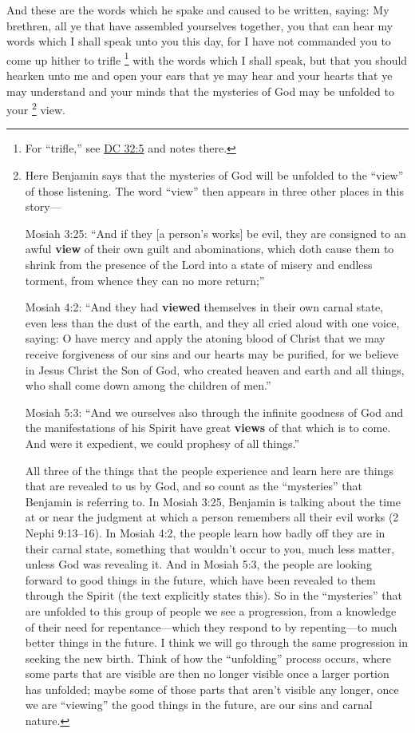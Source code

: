 			And these are the words which he spake and caused to be written, saying:
			My brethren, all ye that have assembled yourselves together,
			you that can hear my words which I shall speak unto you this day,
			for I have not commanded you to come up hither
			to trifle%
				\footnote{%
					For ``trifle,'' see \hyperref[DC32-5]{DC 32:5} and notes there.
					} 
			with the words which I shall speak,
			but that you should hearken unto me
			and open your ears that ye may hear
			and your hearts that ye may understand
			and your minds that the mysteries of God may be unfolded to your
				\footnote{%
					\label{MOSIAH-2-9-NOTE-view}%
					Here Benjamin says that the mysteries of God will be unfolded to the ``view'' of those listening. The word ``view'' then appears in three other places in this story---
						\begin{compactenum}
							\item Mosiah 3:25: ``And if they [a person's works] be evil, they are consigned to an awful \textbf{view} of their own guilt and abominations, which doth cause them to shrink from the presence of the Lord into a state of misery and endless torment, from whence they can no more return;''
							\item Mosiah 4:2: ``And they had \textbf{viewed} themselves in their own carnal state, even less than the dust of the earth, and they all cried aloud with one voice, saying: O have mercy and apply the atoning blood of Christ that we may receive forgiveness of our sins and our hearts may be purified, for we believe in Jesus Christ the Son of God, who created heaven and earth and all things, who shall come down among the children of men.''
							\item Mosiah 5:3: ``And we ourselves also through the infinite goodness of God and the manifestations of his Spirit have great \textbf{views} of that which is to come. And were it expedient, we could prophesy of all things.''
						\end{compactenum}
					All three of the things that the people experience and learn here are things that are revealed to us by God, and so count as the ``mysteries'' that Benjamin is referring to. In Mosiah 3:25, Benjamin is talking about the time at or near the judgment at which a person remembers all their evil works (2 Nephi 9:13--16). In Mosiah 4:2, the people learn how badly off they are in their carnal state, something that wouldn't occur to you, much less matter, unless God was revealing it. And in Mosiah 5:3, the people are looking forward to good things in the future, which have been revealed to them through the Spirit (the text explicitly states this).
					So in the ``mysteries'' that are unfolded to this group of people we see a progression, from a knowledge of their need for repentance---which they respond to by repenting---to much better things in the future. I think we will go through the same progression in seeking the new birth. Think of how the ``unfolding'' process occurs, where some parts that are visible are then no longer visible once a larger portion has unfolded; maybe some of those parts that aren't visible any longer, once we are ``viewing'' the good things in the future, are our sins and carnal nature.
					}%
			view.
			
